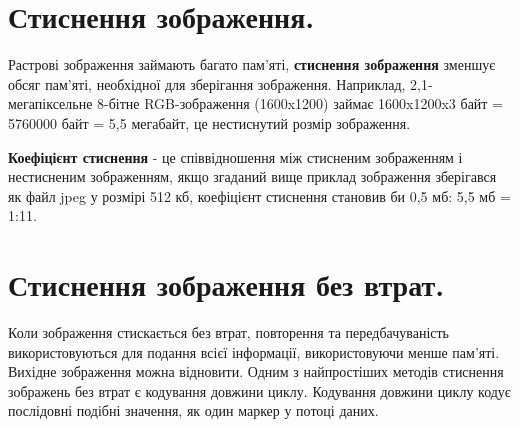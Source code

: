 \documentclass[11pt]{article}
\begin{document}
    \section{Стиснення зображення.}\label{sec:image_compression}
    Растрові зображення займають багато пам'яті, \textbf{стиснення зображення} зменшує обсяг пам'яті, необхідної для зберігання зображення.
    Наприклад, 2,1-мегапіксельне 8-бітне RGB-зображення (1600x1200) займає 1600x1200x3 байт = 5760000 байт = 5,5 мегабайт, це нестиснутий розмір зображення.

    \textbf{Коефіцієнт стиснення} - це співвідношення між стисненим зображенням і нестисненим зображенням, якщо згаданий вище приклад зображення зберігався як файл jpeg у розмірі 512 кб, коефіцієнт стиснення становив би 0,5 мб: 5,5 мб = 1:11.

    \section{Стиснення зображення без втрат.}\label{sec:lossless_image_compression}
    Коли зображення стискається без втрат, повторення та передбачуваність використовуються для подання всієї інформації, використовуючи менше пам'яті.
    Вихідне зображення можна відновити.
    Одним з найпростіших методів стиснення зображень без втрат є кодування довжини циклу.
    Кодування довжини циклу кодує послідовні подібні значення, як один маркер у потоці даних.
\end{document}

